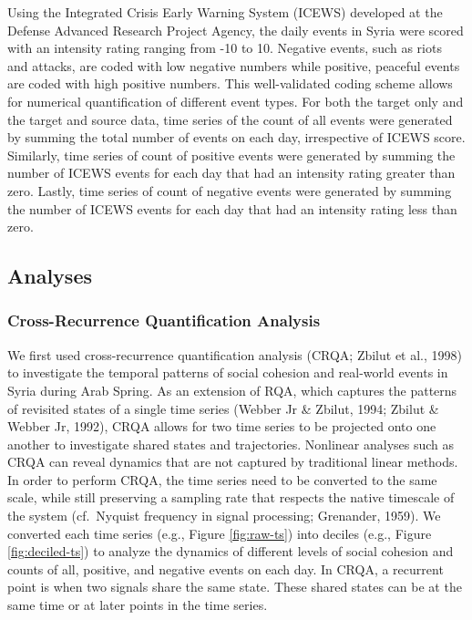 \documentclass[english,man]{apa6}
\begin{document}
Using the Integrated Crisis Early Warning System (ICEWS) developed at the Defense Advanced Research Project Agency, the daily events in Syria were scored with an intensity rating ranging from -10 to 10. Negative events, such as riots and attacks, are coded with low negative numbers while positive, peaceful events are coded with high positive numbers. This well-validated coding scheme allows for numerical quantification of different event types.
For both the target only and the target and source data, time series of the count of all events were generated by summing the total number of events on each day, irrespective of ICEWS score. Similarly, time series of count of positive events were generated by summing the number of ICEWS events for each day that had an intensity rating greater than zero. Lastly, time series of count of negative events were generated by summing the number of ICEWS events for each day that had an intensity rating less than zero.

\hypertarget{analyses}{%
\subsection{Analyses}\label{analyses}}

\hypertarget{cross-recurrence-quantification-analysis}{%
\subsubsection{Cross-Recurrence Quantification Analysis}\label{cross-recurrence-quantification-analysis}}

We first used cross-recurrence quantification analysis (CRQA; Zbilut et al., 1998) to investigate the temporal patterns of social cohesion and real-world events in Syria during Arab Spring. As an extension of RQA, which captures the patterns of revisited states of a single time series (Webber Jr \& Zbilut, 1994; Zbilut \& Webber Jr, 1992), CRQA allows for two time series to be projected onto one another to investigate shared states and trajectories. Nonlinear analyses such as CRQA can reveal dynamics that are not captured by traditional linear methods. In order to perform CRQA, the time series need to be converted to the same scale, while still preserving a sampling rate that respects the native timescale of the system (cf.~Nyquist frequency in signal processing; Grenander, 1959). We converted each time series (e.g., Figure \ref{fig:raw-ts}) into deciles (e.g., Figure \ref{fig:deciled-ts}) to analyze the dynamics of different levels of social cohesion and counts of all, positive, and negative events on each day. In CRQA, a recurrent point is when two signals share the same state. These shared states can be at the same time or at later points in the time series.
\end{document}
